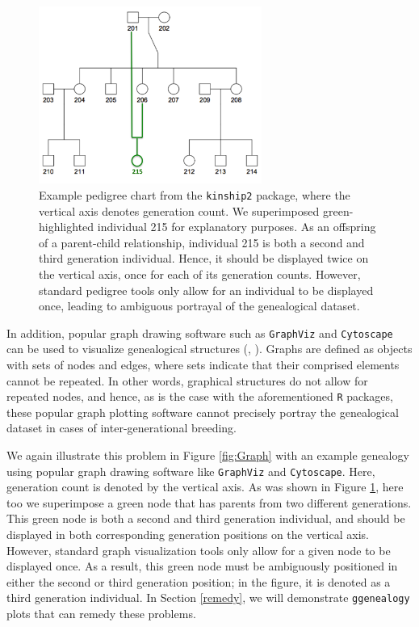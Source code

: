 \documentclass[11pt,a4paper,oldfontcommands,openany]{memoir}
\numberwithin{equation}{section} %
\newcommand{\pkg}[1]{{\texttt{#1}}}
\begin{document}
\begin{figure}[H]
    \begin{framed}
    \centering
    \includegraphics[width=0.65\textwidth]{kinshipFig}
    \end{framed}
    \caption{Example pedigree chart from the \pkg{kinship2} package, where the vertical axis denotes generation count. We superimposed green-highlighted individual 215 for explanatory purposes. As an offspring of a parent-child relationship, individual 215 is both a second and third generation individual. Hence, it should be displayed twice on the vertical axis, once for each of its generation counts. However, standard pedigree tools only allow for an individual to be displayed once, leading to ambiguous portrayal of the genealogical dataset.}
    \label{fig:kinshipFig}
\end{figure}

In addition, popular graph drawing software such as \pkg{GraphViz} and \pkg{Cytoscape} can be used to visualize genealogical structures (\citealt{graphvizCit}, \citealt{cytoscapeCit}). Graphs are defined as objects with sets of nodes and edges, where sets indicate that their comprised elements cannot be repeated. In other words, graphical structures do not allow for repeated nodes, and hence, as is the case with the aforementioned \pkg{R} packages, these popular graph plotting software cannot precisely portray the genealogical dataset in cases of inter-generational breeding.

We again illustrate this problem in Figure \ref{fig:Graph} with an example genealogy using popular graph drawing software like \pkg{GraphViz} and \pkg{Cytoscape}. Here, generation count is denoted by the vertical axis. As was shown in Figure \ref{fig:kinshipFig}, here too we superimpose a green node that has parents from two different generations. This green node is both a second and third generation individual, and should be displayed in both corresponding generation positions on the vertical axis. However, standard graph visualization tools only allow for a given node to be displayed once. As a result, this green node must be ambiguously positioned in either the second or third generation position; in the figure, it is denoted as a third generation individual. In Section \ref{remedy}, we will demonstrate \pkg{ggenealogy} plots that can remedy these problems.
\end{document}
